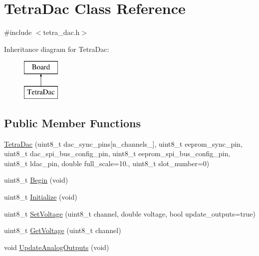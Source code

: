 \hypertarget{classTetraDac}{}\section{Tetra\+Dac Class Reference}
\label{classTetraDac}


{\ttfamily \#include $<$tetra\+\_\+dac.\+h$>$}

Inheritance diagram for Tetra\+Dac\+:\begin{figure}[H]
\begin{center}
\leavevmode
\includegraphics[height=2.000000cm]{classTetraDac}
\end{center}
\end{figure}
\subsection*{Public Member Functions}
\begin{DoxyCompactItemize}
\item 
\mbox{\hyperlink{classTetraDac_a77131270e115bf47b6c582d53cddb881}{Tetra\+Dac}} (uint8\+\_\+t dac\+\_\+sync\+\_\+pins\mbox{[}n\+\_\+channels\+\_\+\mbox{]}, uint8\+\_\+t eeprom\+\_\+sync\+\_\+pin, uint8\+\_\+t dac\+\_\+spi\+\_\+bus\+\_\+config\+\_\+pin, uint8\+\_\+t eeprom\+\_\+spi\+\_\+bus\+\_\+config\+\_\+pin, uint8\+\_\+t ldac\+\_\+pin, double full\+\_\+scale=10., uint8\+\_\+t slot\+\_\+number=0)
\item 
uint8\+\_\+t \mbox{\hyperlink{classTetraDac_aeee47156d6a403ccbb8183b02cca798d}{Begin}} (void)
\item 
uint8\+\_\+t \mbox{\hyperlink{classTetraDac_a57fd4d8db59603efe74c0c3902c64ae9}{Initialize}} (void)
\item 
uint8\+\_\+t \mbox{\hyperlink{classTetraDac_a265bed4317bb6b3b4c6962fa538631da}{Set\+Voltage}} (uint8\+\_\+t channel, double voltage, bool update\+\_\+outputs=true)
\item 
uint8\+\_\+t \mbox{\hyperlink{classTetraDac_a6a5206bc2e525ea820a1b3279526850c}{Get\+Voltage}} (uint8\+\_\+t channel)
\item 
void \mbox{\hyperlink{classTetraDac_ae7e2c1afbc64a8cc0ddd2ef4af0b25b3}{Update\+Analog\+Outputs}} (void)
\end{DoxyCompactItemize}


